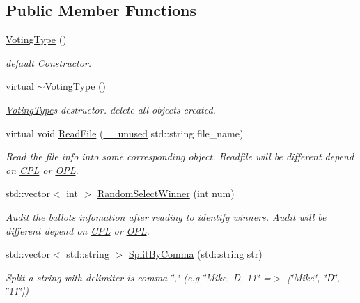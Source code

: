 \subsection*{Public Member Functions}
\begin{DoxyCompactItemize}
\item 
\mbox{\label{classVotingType_a2a7f944632e0c06be1a6508cfe30c4ff}} 
\hyperlink{classVotingType_a2a7f944632e0c06be1a6508cfe30c4ff}{Voting\+Type} ()
\begin{DoxyCompactList}\small\item\em default Constructor. \end{DoxyCompactList}\item 
\mbox{\label{classVotingType_a737646dda28b6773ea6da1bb8c46fed5}} 
virtual \hyperlink{classVotingType_a737646dda28b6773ea6da1bb8c46fed5}{$\sim$\+Voting\+Type} ()
\begin{DoxyCompactList}\small\item\em \hyperlink{classVotingType}{Voting\+Type}\textquotesingle{}s destructor. {\ttfamily delete} all objects created. \end{DoxyCompactList}\item 
virtual void \hyperlink{classVotingType_aea409923e712452a9efd8be643f30f01}{Read\+File} (\hyperlink{common_8h_a2e3484535ee610c8e19e9859563abe48}{\+\_\+\+\_\+unused} std\+::string file\+\_\+name)
\begin{DoxyCompactList}\small\item\em Read the file info into some corresponding object. Readfile will be different depend on \hyperlink{classCPL}{C\+PL} or \hyperlink{classOPL}{O\+PL}. \end{DoxyCompactList}\item 
std\+::vector$<$ int $>$ \hyperlink{classVotingType_a60437fc2b77f6142bd055d241600ba77}{Random\+Select\+Winner} (int num)
\begin{DoxyCompactList}\small\item\em Audit the ballots infomation after reading to identify winners. Audit will be different depend on \hyperlink{classCPL}{C\+PL} or \hyperlink{classOPL}{O\+PL}. \end{DoxyCompactList}\item 
std\+::vector$<$ std\+::string $>$ \hyperlink{classVotingType_afd3cf8ddedcf5d5aae86b86eb8d3bdd0}{Split\+By\+Comma} (std\+::string str)
\begin{DoxyCompactList}\small\item\em Split a string with delimiter is comma \char`\"{},\char`\"{} (e.\+g \char`\"{}\+Mike, D, 11\char`\"{} =$>$ \mbox{[}\char`\"{}\+Mike\char`\"{}, \char`\"{}\+D\char`\"{}, \char`\"{}11\char`\"{}\mbox{]}) \end{DoxyCompactList}\item 

\end{DoxyCompactItemize}
